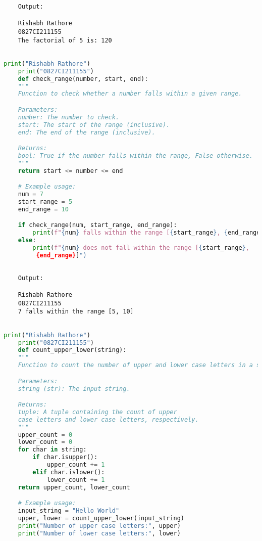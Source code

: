 \documentclass{report}
\begin{document}
\begin{verbatim}
	Output:

	Rishabh Rathore
	0827CI211155
	The factorial of 5 is: 120
	

\end{verbatim}


\bigskip


\sol 
\begin{lstlisting}[language=Python]
	print("Rishabh Rathore")
	print("0827CI211155")
	def check_range(number, start, end):
    """
    Function to check whether a number falls within a given range.

    Parameters:
    number: The number to check.
    start: The start of the range (inclusive).
    end: The end of the range (inclusive).

    Returns:
    bool: True if the number falls within the range, False otherwise.
    """
    return start <= number <= end

	# Example usage:
	num = 7
	start_range = 5
	end_range = 10

	if check_range(num, start_range, end_range):
		print(f"{num} falls within the range [{start_range}, {end_range}]")
	else:
		print(f"{num} does not fall within the range [{start_range},
		 {end_range}]")
  

\end{lstlisting}

\begin{verbatim}
	Output:

	Rishabh Rathore
	0827CI211155
	7 falls within the range [5, 10]


\end{verbatim}


\bigskip


\sol 
\begin{lstlisting}[language=Python]
	print("Rishabh Rathore")
	print("0827CI211155")
	def count_upper_lower(string):
    """
    Function to count the number of upper and lower case letters in a string.

    Parameters:
    string (str): The input string.

    Returns:
    tuple: A tuple containing the count of upper 
	case letters and lower case letters, respectively.
    """
    upper_count = 0
    lower_count = 0
    for char in string:
        if char.isupper():
            upper_count += 1
        elif char.islower():
            lower_count += 1
    return upper_count, lower_count

	# Example usage:
	input_string = "Hello World"
	upper, lower = count_upper_lower(input_string)
	print("Number of upper case letters:", upper)
	print("Number of lower case letters:", lower)

\end{lstlisting}
\end{document}
